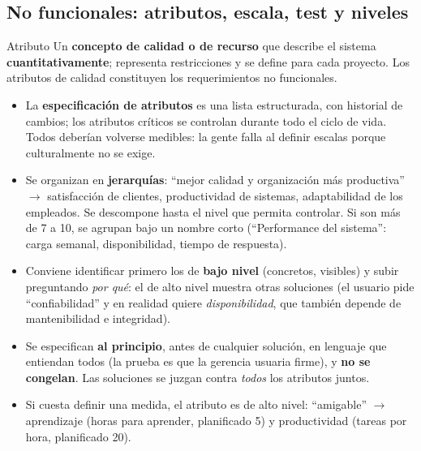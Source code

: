 \documentclass[11pt,a4paper]{article}
\begin{document}
\subsection{No funcionales: atributos, escala, test y niveles}
\begin{defbox}{Atributo}
Un \textbf{concepto de calidad o de recurso} que describe el sistema \textbf{cuantitativamente}; representa
restricciones y se define para cada proyecto. Los atributos de calidad constituyen los requerimientos no
funcionales.
\end{defbox}
\begin{itemize}
  \item La \textbf{especificación de atributos} es una lista estructurada, con historial de cambios; los
  atributos críticos se controlan durante todo el ciclo de vida. Todos deberían volverse medibles: la gente
  falla al definir escalas porque culturalmente no se exige.
  \item Se organizan en \textbf{jerarquías}: ``mejor calidad y organización más productiva'' $\to$ satisfacción
  de clientes, productividad de sistemas, adaptabilidad de los empleados. Se descompone hasta el nivel que
  permita controlar. Si son más de 7 a 10, se agrupan bajo un nombre corto (``Performance del sistema'': carga
  semanal, disponibilidad, tiempo de respuesta).
  \item Conviene identificar primero los de \textbf{bajo nivel} (concretos, visibles) y subir preguntando
  \emph{por qué}: el de alto nivel muestra otras soluciones (el usuario pide ``confiabilidad'' y en realidad
  quiere \emph{disponibilidad}, que también depende de mantenibilidad e integridad).
  \item Se especifican \textbf{al principio}, antes de cualquier solución, en lenguaje que entiendan todos (la
  prueba es que la gerencia usuaria firme), y \textbf{no se congelan}. Las soluciones se juzgan contra
  \emph{todos} los atributos juntos.
  \item Si cuesta definir una medida, el atributo es de alto nivel: ``amigable'' $\to$ aprendizaje (horas para
  aprender, planificado 5) y productividad (tareas por hora, planificado 20).
\end{itemize}
\end{document}
